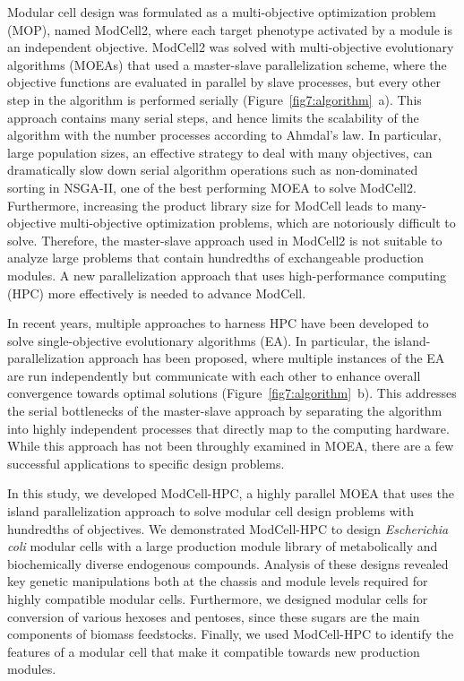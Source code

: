 Modular cell design was formulated as a multi-objective optimization problem (MOP), named ModCell2, where each target phenotype activated by a module is an independent objective.\citep{garcia2019}
ModCell2 was solved with multi-objective evolutionary algorithms (MOEAs) that used a master-slave parallelization scheme, where the objective functions are evaluated in parallel by slave processes, but every other step in the algorithm is performed serially (Figure~\ref{fig7:algorithm}~a).\citep{garcia2019, garcia2019c}
This approach contains many serial steps, and hence limits the scalability of the algorithm with the number processes according to Ahmdal's law.\citep{hill2008}
In particular, large population sizes, an effective strategy to deal with many objectives,\citep{garcia2019c,ishibuchi2009} can dramatically slow down serial algorithm operations such as non-dominated sorting in NSGA-II, \citep{deb2002} one of the best performing MOEA to solve ModCell2.\citep{garcia2019c}
Furthermore, increasing the product library size for ModCell leads to many-objective multi-objective optimization problems, which are notoriously difficult to solve.\citep{ishibuchi2008, li2018}
Therefore, the master-slave approach used in ModCell2 is not suitable to analyze large problems that contain hundredths of exchangeable production modules.
A new parallelization approach that uses high-performance computing (HPC) more effectively is needed to advance ModCell.

In recent years, multiple approaches to harness HPC have been developed to solve single-objective evolutionary algorithms (EA). \citep{alba2013}
In particular, the island-parallelization approach has been proposed, where multiple instances of the EA are run independently but communicate with each other to enhance overall convergence towards optimal solutions (Figure~\ref{fig7:algorithm}~b).
This addresses the serial bottlenecks of the master-slave approach by separating the algorithm into highly independent processes that directly map to the computing hardware.
While this approach has not been throughly examined in MOEA, there are a few successful applications to specific design problems.\citep{martens2013, jozefowiez2005, garcia2016}

In this study, we developed ModCell-HPC, a highly parallel MOEA that uses the island parallelization approach to solve modular cell design problems with hundredths of objectives.
We demonstrated ModCell-HPC to design \textit{Escherichia coli} modular cells with a large production module library of metabolically and biochemically diverse endogenous compounds.
Analysis of these designs revealed key genetic manipulations both at the chassis and module levels required for highly compatible modular cells.
Furthermore, we designed modular cells for conversion of various hexoses and pentoses, since these sugars are the main components of biomass feedstocks.\citep{brodeur2011}
Finally, we used ModCell-HPC to identify the features of a modular cell that make it compatible towards new production modules. %

